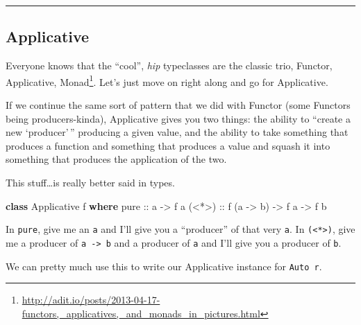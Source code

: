 \documentclass[]{article}
\newenvironment{Shaded}{}{}
\newcommand{\DataTypeTok}[1]{\textcolor[rgb]{0.56,0.13,0.00}{#1}}
\newcommand{\KeywordTok}[1]{\textcolor[rgb]{0.00,0.44,0.13}{\textbf{#1}}}
\newcommand{\NormalTok}[1]{#1}
\newcommand{\OtherTok}[1]{\textcolor[rgb]{0.00,0.44,0.13}{#1}}
\renewcommand{\href}[2]{#2\footnote{\url{#1}}}
\begin{document}
\begin{center}\rule{0.5\linewidth}{0.5pt}\end{center}

\subsection{Applicative}\label{applicative}

Everyone knows that the ``cool'', \emph{hip} typeclasses are the classic trio,
\href{http://adit.io/posts/2013-04-17-functors,_applicatives,_and_monads_in_pictures.html}{Functor,
Applicative, Monad}. Let's just move on right along and go for Applicative.

If we continue the same sort of pattern that we did with Functor (some Functors
being producers-kinda), Applicative gives you two things: the ability to
``create a new `producer'\,'' producing a given value, and the ability to take
something that produces a function and something that produces a value and
squash it into something that produces the application of the two.

This stuff\ldots is really better said in types.

\begin{Shaded}
\begin{Highlighting}[]
\KeywordTok{class} \DataTypeTok{Applicative}\NormalTok{ f }\KeywordTok{where}
\OtherTok{    pure  ::}\NormalTok{ a }\OtherTok{{-}\textgreater{}}\NormalTok{ f a}
\OtherTok{    (\textless{}*\textgreater{}) ::}\NormalTok{ f (a }\OtherTok{{-}\textgreater{}}\NormalTok{ b) }\OtherTok{{-}\textgreater{}}\NormalTok{ f a }\OtherTok{{-}\textgreater{}}\NormalTok{ f b}
\end{Highlighting}
\end{Shaded}

In \texttt{pure}, give me an \texttt{a} and I'll give you a ``producer'' of that
very \texttt{a}. In \texttt{(\textless{}*\textgreater{})}, give me a producer of
\texttt{a\ -\textgreater{}\ b} and a producer of \texttt{a} and I'll give you a
producer of \texttt{b}.

We can pretty much use this to write our Applicative instance for
\texttt{Auto\ r}.
\end{document}
